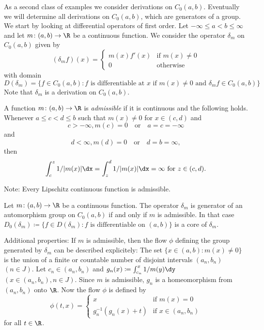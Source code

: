 As a second class of examples we consider derivations on $C_{0}(a,b)$.
Eventually we will determine all derivations on $C_{0}(a,b)$, which are generators of a group.
We start by looking at differential operators of first order.
Let $-\infty \leq a < b \leq \infty$ and let $m \colon (a,b) \to \R$ be a continuous function.
We consider the operator $\delta_{m}$ on $C_{0}(a,b)$ given by
\begin{equation*}\label{eq:b2-delta-m}
(\delta_{m}f)(x) = \begin{cases}
    m(x)f'(x) & \text{if } m(x) \neq 0 \\
    0 & \text{otherwise}
\end{cases}
\end{equation*}
with domain  
\[
D(\delta_{m}) = \{ f \in C_{0}(a,b) \colon f \text{ is differentiable at } x \text{ if } m(x) \neq 0 \text{ and } \delta_{m}f \in C_{0}(a,b) \}
\]
Note that $\delta_{m}$ is a derivation on $C_{0}(a,b)$.
\begin{definition}\label{def:b2-3.16}
%
A function $m \colon (a,b) \to \R$ is \emph{admissible} if it is continuous and the following holds.
Whenever $a \leq c < d \leq b$ such that $m(x) \neq 0$ for $x \in (c,d)$ and 
\[
c > -\infty, m(c) = 0
\quad \text{or} \quad
a = c = -\infty
\]
and
\[
d < \infty, m(d) = 0
\quad \text{or} \quad
d = b = \infty, 
\]
then
\begin{equation*}\label{eq:b2-3.16-KGK.1}
\int_{c}^{z} 1/|m(x)| \dx = \int_{z}^{d} 1/|m(x)| \dx = \infty \text{ for } z \in (c,d).
\end{equation*}
\end{definition}
Note: Every Lipschitz continuous function is admissible.
\begin{theorem}\label{thm:b2-3.17}
%
Let $m \colon (a,b) \to \R$ be a continuous function.
The operator $\delta_{m}$ is generator of an automorphism group on $C_{0}(a,b)$ if and only if\/ $m$ is admissible.
In that case $D_{0}(\delta_{m}) \coloneqq \{ f \in D(\delta_{m}) \colon f \text{ is differentiable on } (a,b)\}$ is a core of\/ $\delta_{m}$.

\textup{Additional properties:} If\/ $m$ is admissible, then the flow $\phi$ defining the group generated by $\delta_{m}$ can be described explicitely:
The set $\{x \in (a,b) \colon m(x) \neq 0\}$ is the union of a finite or countable number of disjoint intervals $(a_{n},b_{n})$ $(n \in J)$.
Let $c_{n} \in (a_{n},b_{n})$ and $g_{n}(x) \coloneqq \int_{c_{n}}^{x} 1/m(y) \dy$ $(x \in (a_{n},b_{n}), n \in J)$.
Since $m$ is admissible, $g_{n}$ is a homeomorphism from $(a_{n},b_{n})$ onto $\R$.
Now the flow $\phi$ is defined by
\begin{equation}\label{eq:b2-3.22}
\phi(t,x) = \begin{cases}
    x & \text{if } m(x) = 0 \\
    g_{n}^{-1}(g_{n}(x)+t) & \text{if } x \in (a_{n},b_{n})
\end{cases}
\end{equation}
for all $t \in \R$.
\end{theorem}
